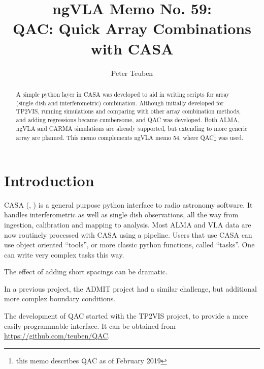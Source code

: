 \documentclass[11pt,twoside]{article}
\begin{document}
\title{ngVLA Memo No. 59: \\ QAC: Quick Array Combinations with CASA}
\author{Peter Teuben}



\begin{abstract}

A simple python layer in CASA was developed to aid in writing scripts
for array (single dish and interferometric) combination. Although
initially developed for TP2VIS, running simulations and comparing with
other array combination methods, and adding regressions became
cumbersome, and QAC was developed. Both ALMA, ngVLA and CARMA
simulations are already supported, but extending to more generic array
are planned. This memo complements ngVLA memo 54, where
QAC\footnote{this memo describes QAC as of February 2019}
was used.


\end{abstract}




\section{Introduction}

CASA (\citet{casa1}, \citet{casa2}) 
is a general purpose python interface to radio
astronomy software. It handles interferometric as well as single dish
observations, all the way from ingestion, calibration and mapping to
analysis. Most ALMA and VLA data are now routinely processed with CASA
using a pipeline.  Users that use CASA can use object oriented
``tools'', or more classic python functions, called
``tasks''. One can write very complex tasks this way.

The effect of adding short spacings can be dramatic.

In a previous project, the ADMIT project had a similar challenge, but
additional more complex boundary conditions.

The development of QAC started with the TP2VIS project, to provide a
more easily programmable interface. It can be obtained from
\url{https://github.com/teuben/QAC}.
\end{document}

